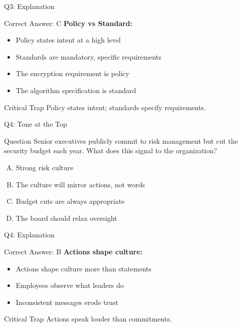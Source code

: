 \documentclass{beamer}
\begin{document}
	\begin{frame}{Q3: Explanation}
		\begin{block}{Correct Answer: C}
			\textbf{Policy vs Standard:}
			\begin{itemize}
				\item Policy states intent at a high level
				\item Standards are mandatory, specific requirements
				\item The encryption requirement is policy
				\item The algorithm specification is standard
			\end{itemize}
		\end{block}
		\begin{alertblock}{Critical Trap}
			Policy states intent; standards specify requirements.
		\end{alertblock}
	\end{frame}
	
	\begin{frame}{Q4: Tone at the Top}
		\begin{block}{Question}
			Senior executives publicly commit to risk management but cut the security budget each year. What does this signal to the organization?
		\end{block}
		\begin{enumerate}[(A)]
			\item Strong risk culture
			\item The culture will mirror actions, not words
			\item Budget cuts are always appropriate
			\item The board should relax oversight
		\end{enumerate}
	\end{frame}
	
	\begin{frame}{Q4: Explanation}
		\begin{block}{Correct Answer: B}
			\textbf{Actions shape culture:}
			\begin{itemize}
				\item Actions shape culture more than statements
				\item Employees observe what leaders do
				\item Inconsistent messages erode trust
			\end{itemize}
		\end{block}
		\begin{alertblock}{Critical Trap}
			Actions speak louder than commitments.
		\end{alertblock}
	\end{frame}
	
\end{document}
